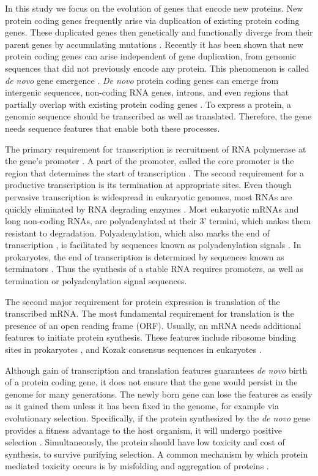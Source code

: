 \documentclass[12pt,a4paper]{article}
\begin{document}
In this study we focus on the evolution of genes that encode new proteins. New protein coding genes frequently arise via duplication of existing protein coding genes. These duplicated genes then genetically and functionally diverge from their parent genes by accumulating mutations \citep{Long2003,IAD}. Recently it has been shown that new protein coding genes can arise independent of gene duplication, from genomic sequences that did not previously encode any protein. This phenomenon is called \textit{de novo} gene emergence \citep{EBB-F1000,vanOss}. \textit{De novo} protein coding genes can emerge from intergenic sequences, non-coding RNA genes, introns, and even regions that partially overlap with existing protein coding genes \citep{vanOss}. To express a protein, a genomic sequence should be transcribed as well as translated. Therefore, the gene needs sequence features that enable both these processes. 

The primary requirement for transcription is recruitment of RNA polymerase at the gene's promoter \citep{Promoters}. A part of the promoter, called the core promoter is the region that determines the start of transcription \citep{corepromoters}. The second requirement for a productive transcription is its termination at appropriate sites. Even though pervasive transcription is widespread in eukaryotic genomes, most RNAs are quickly eliminated by RNA degrading enzymes \citep{RNAturnover}. Most eukaryotic mRNAs and long non-coding RNAs, are polyadenylated at their 3' termini, which makes them resistant to degradation. Polyadenylation, which also marks the end of transcription \citep{polyAterm}, is facilitated by sequences known as polyadenylation signals \citep{polyA}. In prokaryotes, the end of transcription is determined by sequences known as terminators \citep{ProkTerm}. Thus the synthesis of a stable RNA requires promoters, as well as termination or polyadenylation signal sequences.

The second major requirement for protein expression is translation of the transcribed mRNA. The most fundamental requirement for translation is the presence of an open reading frame (ORF). Usually, an mRNA needs additional features to initiate protein synthesis. These features include ribosome binding sites in prokaryotes \citep{RBS}, and Kozak consensus sequences in eukaryotes \citep{kozak,kozakDroso,kozakHuman}. 

Although gain of transcription and translation features guarantees \textit{de novo} birth of a protein coding gene, it does not ensure that the gene would persist in the genome for many generations. The newly born gene can lose the features as easily as it gained them unless it has been fixed in the genome, for example via evolutionary selection. Specifically, if the protein synthesized by the \textit{de novo} gene provides a fitness advantage to the host organism, it will undergo positive selection \citep{deNovoFunction}. Simultaneously, the protein should have low toxicity and cost of synthesis, to survive purifying selection. A common mechanism by which protein mediated toxicity occurs is by misfolding and aggregation of proteins \citep{misfold1,misfold2}.
\end{document}
